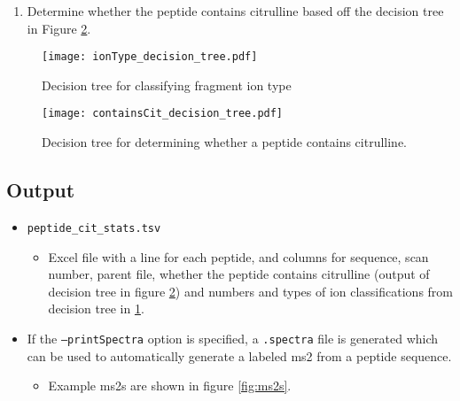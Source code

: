 \documentclass[12pt]{article}
\begin{document}
\begin{enumerate}
\begin{itemize}
\begin{itemize}
			\end{itemize}

		\end{itemize}

		\item Determine whether the peptide contains citrulline based off the decision tree in Figure \ref{fig:containsCit_tree}.  

	\end{enumerate}

	\begin{figure}[h!]
			\centering
			\texttt{[image: ionType\_decision\_tree.pdf]}
			\caption{Decision tree for classifying fragment ion type}
			\label{fig:ionType_tree}
		\end{figure}

	\begin{figure}[h!]
		\centering
		\texttt{[image: containsCit\_decision\_tree.pdf]}
		\caption{Decision tree for determining whether a peptide contains citrulline.}
		\label{fig:containsCit_tree}
	\end{figure}


	\subsection{Output} %
	\label{sub:output}

	\begin{itemize}
		\item \texttt{peptide\_cit\_stats.tsv}
		\begin{itemize}
			\item Excel file with a line for each peptide, and columns for sequence, scan number, parent file, whether the peptide contains citrulline (output of decision tree in figure \ref{fig:containsCit_tree}) and numbers and types of ion classifications from decision tree in \ref{fig:ionType_tree}.  
		\end{itemize}

		\item If the \texttt{--printSpectra} option is specified, a \texttt{.spectra} file is generated which can be used to automatically generate a labeled ms2 from a peptide sequence.
		\begin{itemize}
			\item Example ms2s are shown in figure \ref{fig:ms2s}.
		\end{itemize}
	\end{itemize}
\end{document}
